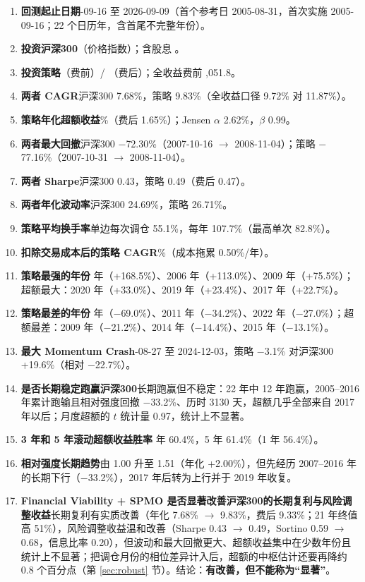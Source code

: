 \documentclass[11pt,a4paper]{article}
\begin{document}
\begin{enumerate}[leftmargin=2em,itemsep=2pt]
\item \textbf{回测起止日期}-09-16 至 2026-09-09（首个参考日 2005-08-31，首次实施 2005-09-16；22 个日历年，含首尾不完整年份）。
\item \textbf{ 投资沪深300}\quad {}（价格指数）；含股息 。
\item \textbf{ 投资策略}\quad {}（费前）/ （费后）；全收益费前 ,051.8。
\item \textbf{两者 CAGR}\quad 沪深300 7.68\%，策略 9.83\%（全收益口径 9.72\% 对 11.87\%）。
\item \textbf{策略年化超额收益}\%（费后 1.65\%）；Jensen $\alpha$ 2.62\%，$\beta$ 0.99。
\item \textbf{两者最大回撤}\quad 沪深300 $-$72.30\%（2007-10-16 $\rightarrow$ 2008-11-04）；策略 $-$77.16\%（2007-10-31 $\rightarrow$ 2008-11-04）。
\item \textbf{两者 Sharpe}\quad 沪深300 0.43，策略 0.49（费后 0.47）。
\item \textbf{两者年化波动率}\quad 沪深300 24.69\%，策略 26.71\%。
\item \textbf{策略平均换手率}\quad 单边每次调仓 55.1\%，每年 107.7\%（最高单次 82.8\%）。
\item \textbf{扣除交易成本后的策略 CAGR}\%（成本拖累 0.50\%/年）。
\item \textbf{策略最强的年份} 年（+168.5\%）、2006 年（+113.0\%）、2009 年（+75.5\%）；超额最大：2020 年（+33.0\%）、2019 年（+23.4\%）、2017 年（+22.7\%）。
\item \textbf{策略最差的年份} 年（$-$69.0\%）、2011 年（$-$34.2\%）、2022 年（$-$27.0\%）；超额最差：2009 年（$-$21.2\%）、2014 年（$-$14.4\%）、2015 年（$-$13.1\%）。
\item \textbf{最大 Momentum Crash}-08-27 至 2024-12-03，策略 $-$3.1\% 对沪深300 +19.6\%（相对 $-$22.7\%）。
\item \textbf{是否长期稳定跑赢沪深300}\quad 长期跑赢但不稳定：22 年中 12 年跑赢，2005--2016 年累计跑输且相对强度回撤 $-$33.2\%、历时 3130 天，超额几乎全部来自 2017 年以后；月度超额的 $t$ 统计量 0.97，统计上不显著。
\item \textbf{3 年和 5 年滚动超额收益胜率} 年 60.4\%，5 年 61.4\%（1 年 56.4\%）。
\item \textbf{相对强度长期趋势}\quad 由 1.00 升至 1.51（年化 +2.00\%），但先经历 2007--2016 年的长期下行（$-$33.2\%），2017 年后转为上行并于 2019 年收复。
\item \textbf{Financial Viability + SPMO 是否显著改善沪深300的长期复利与风险调整收益}\quad 长期复利有实质改善（年化 7.68\% $\rightarrow$ 9.83\%，费后 9.33\%；21 年终值高 51\%），风险调整收益温和改善（Sharpe 0.43 $\rightarrow$ 0.49，Sortino 0.59 $\rightarrow$ 0.68，信息比率 0.20），但波动和最大回撤更大、超额收益集中在少数年份且统计上不显著；把调仓月份的相位差异计入后，超额的中枢估计还要再降约 0.8 个百分点（第 \ref{sec:robust} 节）。结论：\textbf{有改善，但不能称为“显著”}。
\end{enumerate}
\end{document}
